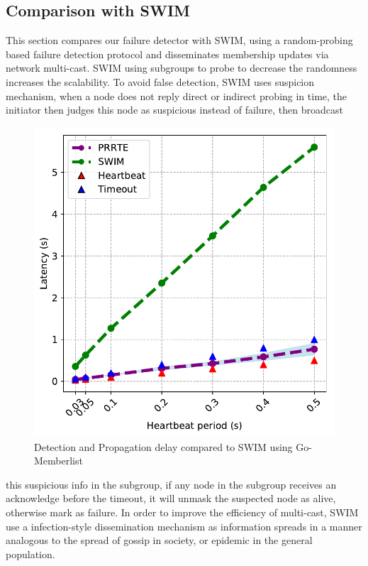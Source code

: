 \documentclass[sigconf]{acmart}
\begin{document}
\subsection{Comparison with SWIM}
This section compares our failure detector with SWIM\cite{Abhinandan02}, using a random-probing based failure detection protocol and disseminates membership updates via network multi-cast. SWIM using subgroups to probe to decrease the randomness increases the scalability. To avoid false detection, SWIM uses suspicion mechanism, when a node does not reply direct or indirect probing in time, the initiator then judges this node as suspicious instead of failure, then broadcast
\begin{figure}[h]
  \centering
  \includegraphics[width=\linewidth]{HB_prrte_swim.pdf}
  \caption{Detection and Propagation delay compared to SWIM using Go-Memberlist}
\end{figure}
this suspicious info in the subgroup, if any node in the subgroup receives an acknowledge before the timeout, it will unmask the suspected node as alive, otherwise mark as failure. In order to improve the efficiency of multi-cast, SWIM use a infection-style dissemination mechanism as information spreads in a manner analogous to the spread of gossip in society, or epidemic in the general population.
\end{document}
